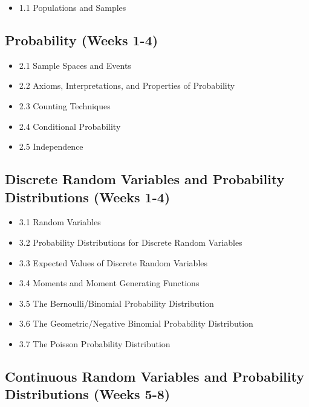 \documentclass[]{book}
\providecommand{\tightlist}{%
  \setlength{\itemsep}{0pt}\setlength{\parskip}{0pt}}
\providecommand{\tightlist}{%
  \setlength{\itemsep}{0pt}\setlength{\parskip}{0pt}}
\theoremstyle{definition}
\theoremstyle{definition}
\theoremstyle{definition}
\theoremstyle{remark}
\begin{document}
\begin{itemize}
\tightlist
\item
  1.1 Populations and Samples
\end{itemize}

\subsection*{Probability (Weeks 1-4)}\label{probability-weeks-1-4}

\begin{itemize}
\tightlist
\item
  2.1 Sample Spaces and Events
\item
  2.2 Axioms, Interpretations, and Properties of Probability
\item
  2.3 Counting Techniques
\item
  2.4 Conditional Probability
\item
  2.5 Independence
\end{itemize}

\subsection*{Discrete Random Variables and Probability Distributions
(Weeks
1-4)}\label{discrete-random-variables-and-probability-distributions-weeks-1-4}

\begin{itemize}
\tightlist
\item
  3.1 Random Variables
\item
  3.2 Probability Distributions for Discrete Random Variables
\item
  3.3 Expected Values of Discrete Random Variables
\item
  3.4 Moments and Moment Generating Functions
\item
  3.5 The Bernoulli/Binomial Probability Distribution
\item
  3.6 The Geometric/Negative Binomial Probability Distribution
\item
  3.7 The Poisson Probability Distribution
\end{itemize}

\subsection*{Continuous Random Variables and Probability Distributions
(Weeks
5-8)}\label{continuous-random-variables-and-probability-distributions-weeks-5-8}
\end{document}

